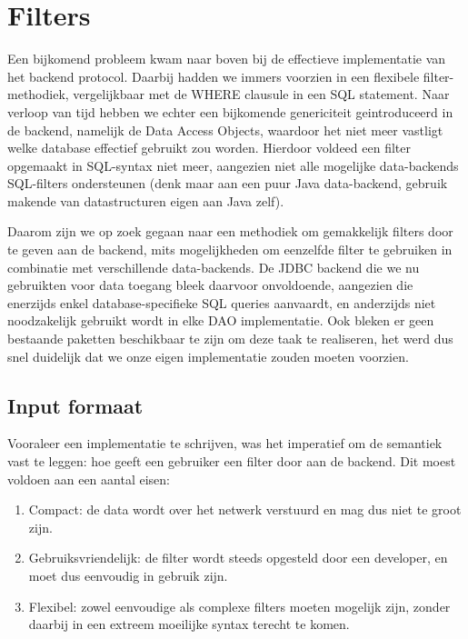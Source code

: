\chapter{Filters}

Een bijkomend probleem kwam naar boven bij de effectieve implementatie van het backend protocol. Daarbij hadden we immers voorzien in een flexibele filter-methodiek, vergelijkbaar met de WHERE clausule in een SQL statement.
Naar verloop van tijd hebben we echter een bijkomende genericiteit geintroduceerd in de backend, namelijk de Data Access Objects, waardoor het niet meer vastligt welke database effectief gebruikt zou worden. Hierdoor voldeed een filter opgemaakt in SQL-syntax niet meer, aangezien niet alle mogelijke data-backends SQL-filters ondersteunen (denk maar aan een puur Java data-backend, gebruik makende van datastructuren eigen aan Java zelf).

Daarom zijn we op zoek gegaan naar een methodiek om gemakkelijk filters door te geven aan de backend, mits mogelijkheden om eenzelfde filter te gebruiken in combinatie met verschillende data-backends. De JDBC backend die we nu gebruikten voor data toegang bleek daarvoor onvoldoende, aangezien die enerzijds enkel database-specifieke SQL queries aanvaardt, en anderzijds niet noodzakelijk gebruikt wordt in elke DAO implementatie. Ook bleken er geen bestaande paketten beschikbaar te zijn om deze taak te realiseren, het werd dus snel duidelijk dat we onze eigen implementatie zouden moeten voorzien.


\section{Input formaat}

Vooraleer een implementatie te schrijven, was het imperatief om de semantiek vast te leggen: hoe geeft een gebruiker een filter door aan de backend. Dit moest voldoen aan een aantal eisen:
\begin{enumerate}
\item Compact: de data wordt over het netwerk verstuurd en mag dus niet te groot zijn.
\item Gebruiksvriendelijk: de filter wordt steeds opgesteld door een developer, en moet dus eenvoudig in gebruik zijn.
\item Flexibel: zowel eenvoudige als complexe filters moeten mogelijk zijn, zonder daarbij in een extreem moeilijke syntax terecht te komen.
\end{enumerate}

